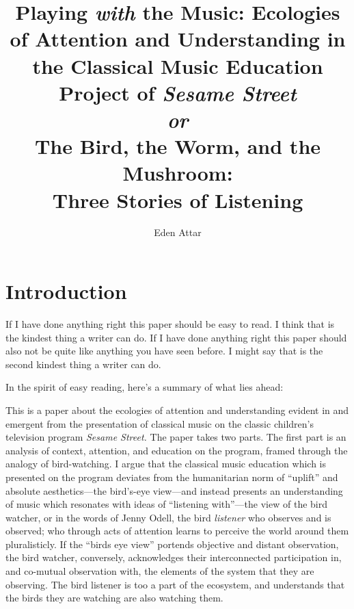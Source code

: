 \documentclass[12pt,letterpaper]{article}
\begin{document}
	
	\title{Playing \textit{with} the Music: Ecologies of Attention and 
	Understanding in the Classical Music Education Project of 
	\textit{Sesame Street}\\
	\vspace*{12pt}
	\large
	\textit{or}\\
	\vspace*{12pt}
	\Large
	The Bird, the Worm, and the Mushroom:\\ Three Stories of Listening}
	\author{Eden Attar}
	\maketitle
	\doublespacing
	\thispagestyle{empty}
	\newpage
	\clearpage
	\setcounter{page}{1}
	\thispagestyle{empty}
	\frenchspacing
	
	\section*{Introduction}	

	If I have done anything right this paper should be easy to read. I
	think that is the kindest thing a writer can do. If I have
	done anything right this paper should also not be quite like anything 
	you have seen before. I might say that is the second kindest thing a 
	writer can do.  

	In the spirit of easy reading, here's a summary of what lies ahead:

	This is a paper about the ecologies of attention and understanding 
	evident in and emergent from the presentation of classical music on the
	classic children's television program \textit{Sesame Street.}  
	The paper takes two parts. The first part is an analysis of context,
	attention, and education on the program, framed through the analogy of
	bird-watching. I argue that the classical music education which is 
	presented on the program deviates from the humanitarian norm of 
	``uplift'' and absolute aesthetics---the bird's-eye view---and instead
	presents an understanding of music which resonates with ideas of 
	``listening with''---the view of the bird watcher, or in the words of
	Jenny Odell, the bird \textit{listener} who observes and is observed;
	who through acts of attention learns to perceive the world around them
	pluralisticly. If the ``birds eye view'' portends objective and distant
	observation, the bird watcher, conversely, acknowledges their 
	interconnected participation in, and co-mutual observation with, the 
	elements of the system that they are observing. The bird listener is 
	too a part of the ecosystem, and understands that the birds they
	are watching are also watching them. 
\end{document}
